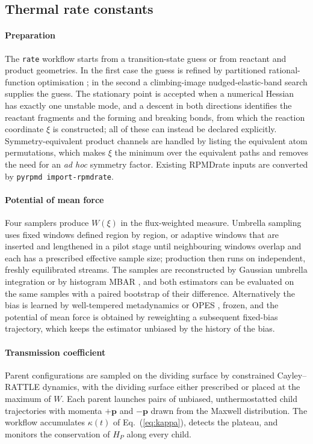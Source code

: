 \documentclass[preprint,12pt]{elsarticle}
\newcommand{\code}[1]{\texttt{#1}}
\begin{document}
\subsection{Thermal rate constants}

\paragraph{Preparation} The \code{rate} workflow starts from a transition-state guess or from reactant and product geometries. In the first case the guess is refined by partitioned rational-function optimisation \cite{samp-prfo1985}; in the second a climbing-image nudged-elastic-band search \cite{samp-cineb2000} supplies the guess. The stationary point is accepted when a numerical Hessian has exactly one unstable mode, and a descent in both directions identifies the reactant fragments and the forming and breaking bonds, from which the reaction coordinate $\xi$ is constructed; all of these can instead be declared explicitly. Symmetry-equivalent product channels are handled by listing the equivalent atom permutations, which makes $\xi$ the minimum over the equivalent paths and removes the need for an \emph{ad hoc} symmetry factor. Existing RPMDrate inputs are converted by \code{pyrpmd import-rpmdrate}.

\paragraph{Potential of mean force} Four samplers produce $W(\xi)$ in the flux-weighted measure. Umbrella sampling uses fixed windows defined region by region, or adaptive windows that are inserted and lengthened in a pilot stage until neighbouring windows overlap and each has a prescribed effective sample size; production then runs on independent, freshly equilibrated streams. The samples are reconstructed by Gaussian umbrella integration \cite{samp-ui2005} or by histogram MBAR \cite{samp-mbar2008}, and both estimators can be evaluated on the same samples with a paired bootstrap of their difference. Alternatively the bias is learned by well-tempered metadynamics \cite{samp-meta2002,samp-wt2008} or OPES \cite{samp-opes2020}, frozen, and the potential of mean force is obtained by reweighting a subsequent fixed-bias trajectory, which keeps the estimator unbiased by the history of the bias.

\paragraph{Transmission coefficient} Parent configurations are sampled on the dividing surface by constrained Cayley--RATTLE dynamics, with the dividing surface either prescribed or placed at the maximum of $W$. Each parent launches pairs of unbiased, unthermostatted child trajectories with momenta $+\mathbf p$ and $-\mathbf p$ drawn from the Maxwell distribution. The workflow accumulates $\kappa(t)$ of Eq.~(\ref{eq:kappa}), detects the plateau, and monitors the conservation of $H_P$ along every child.
\end{document}
